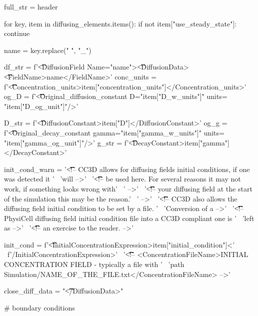 \begin{python}
    full_str = header

    for key, item in diffusing_elements.items():
        if not item["use_steady_state"]:
            continue

        name = key.replace(" ", "_")

        df_str = f'\t\t<DiffusionField Name="{name}">\n\t\t\t<DiffusionData>\n\t\t\t\t<FieldName>{name}</FieldName>\n'
        conc_units = f'\t\t\t\t<Concentration_units>{item["concentration_units"]}</Concentration_units>\n'
        og_D = f'\t\t\t\t<Original_diffusion_constant D="{item["D_w_units"]}" units= "{item["D_og_unit"]}"/>\n'

        D_str = f'\t\t\t\t<DiffusionConstant>{item["D"]}</DiffusionConstant>\n'
        og_g = f'\t\t\t\t<Original_decay_constant gamma="{item["gamma_w_units"]}" units= "{item["gamma_og_unit"]}"/>\n'
        g_str = f'\t\t\t\t<DecayConstant>{item["gamma"]}</DecayConstant>\n'

        init_cond_warn = '\t\t\t\t<!-- CC3D allows for diffusing fields initial conditions, if one was detected it ' \
                         'will -->\n' \
                         '\t\t\t\t<!-- be used here. For several reasons it may not work, if something looks wrong with' \
                         ' -->\n' \
                         '\t\t\t\t<!-- your diffusing field at the start of the simulation this may be the reason.' \
                         ' -->\n' \
                         '\t\t\t\t<!-- CC3D also allows the diffusing field initial condition to be set by a file. ' \
                         'Conversion of a -->\n' \
                         '\t\t\t\t<!-- PhysiCell diffusing field initial condition file into a CC3D compliant one is ' \
                         'left as -->\n' \
                         '\t\t\t\t<!-- an exercise to the reader. -->\n'

        init_cond = f'\t\t\t\t <InitialConcentrationExpression>{item["initial_condition"]}<' \
            f'/InitialConcentrationExpression>' \
            '\n\t\t\t\t<!-- <ConcentrationFileName>INITIAL CONCENTRATION FIELD - typically a file with ' \
            'path Simulation/NAME_OF_THE_FILE.txt</ConcentrationFileName> -->'

        close_diff_data = "\t\t\t</DiffusionData>\n"

        # boundary conditions


\end{python}
